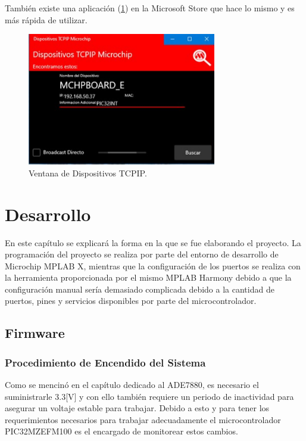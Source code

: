 \documentclass[letterpaper,12pt,oneside]{book}
\begin{document}
			También existe una aplicación (\ref{TCPIP2}) en la Microsoft Store que hace lo mismo y es más rápida de utilizar.

			\begin{figure}[!htpb]
				\centering
				\includegraphics[scale = 0.8]{Material de Consulta/DispTCP.PNG}
				\caption[Dispositivos TCPIP]{Ventana de Dispositivos TCPIP.}
				\label{TCPIP2}
			\end{figure}

	\chapter{Desarrollo}
		En este capítulo se explicará la forma en la que se fue elaborando el proyecto. La programación del proyecto se realiza por parte del entorno de desarrollo de Microchip MPLAB X, mientras que la configuración de los puertos se realiza con la herramienta proporcionada por el mismo MPLAB Harmony debido a que la configuración manual sería demasiado complicada debido a la cantidad de puertos, pines y servicios disponibles por parte del microcontrolador.

		\section{Firmware}
			\subsection{Procedimiento de Encendido del Sistema}
			Como se mencinó en el capítulo dedicado al ADE7880, es necesario el suministrarle 3.3[V] y con ello también requiere un periodo de inactividad para asegurar un voltaje estable para trabajar. Debido a esto y para tener los requerimientos necesarios para trabajar adecuadamente el microcontrolador PIC32MZEFM100 es el encargado de monitorear estos cambios.
\end{document}
